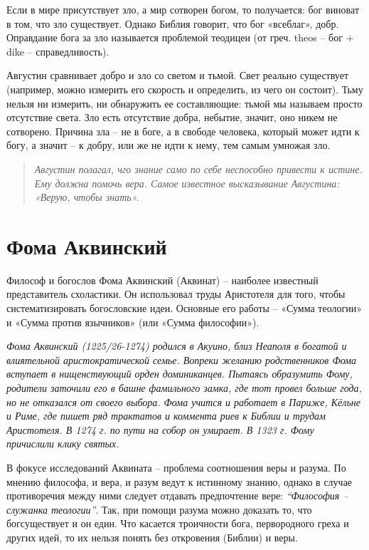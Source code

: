 \documentclass[
]{article}
\begin{document}
Если в мире присутствует зло, а мир сотворен богом, то получается: бог
виноват в том, что зло существует. Однако Библия говорит, что бог
«всеблаг», добр. Оправдание бога за зло называется проблемой теодицеи
(от греч. theos -- бог + dike -- справедливость).

Августин сравнивает добро и зло со светом и тьмой. Свет реально
существует (например, можно измерить его скорость и определить, из чего
он состоит). Тьму нельзя ни измерить, ни обнаружить ее составляющие:
тьмой мы называем просто отсутствие света. Зло есть отсутствие добра,
небытие, значит, оно никем не сотворено. Причина зла -- не в боге, а в
свободе человека, который может идти к богу, а значит -- к добру, или же
не идти к нему, тем самым умножая зло.

\begin{quote}
\emph{Августин полагал, чго знание само по себе неспособно привести к
истине. Ему должна помочь вера. Самое известное высказывание Августина:
«Верую, чтобы знать».}
\end{quote}

\hypertarget{ux444ux43eux43cux430-ux430ux43aux432ux438ux43dux441ux43aux438ux439}{%
\section{Фома
Аквинский}\label{ux444ux43eux43cux430-ux430ux43aux432ux438ux43dux441ux43aux438ux439}}

Философ и богослов Фома Аквинский (Аквинат) -- наиболее известный
представитель схоластики. Он использовал труды Аристотеля для того,
чтобы систематизировать богословские идеи. Основные его работы -- «Сумма
теологии» и «Сумма против язычников» (или «Сумма философии»).

\emph{Фома Аквинский (1225/26-1274) родился в Акуино, близ Неаполя в
богатой и влиятельной аристократической семье. Вопреки желанию
родственников Фома вступает в нищенствующий орден доминиканцев. Пытаясь
образумить Фому, родители заточили его в башне фамильного замка, где тот
провел больше года, но не отказался от своего выбора. Фома учится и
работает в Париже, Кёльне и Риме, где пишет ряд трактатов и коммента­
риев к Библии и трудам Аристотеля. В 1274 г. по пути на собор он
умирает. В 1323 г. Фому причислили клику святых.}

В фокусе исследований Аквината -- проблема соотношения веры и разума. По
мнению философа, и вера, и разум ведут к истинному знанию, однако в
случае противоречия между ними следует отдавать предпочтение вере:
\emph{``Философия -- служанка теологии''}. Так, при помощи разума можно
доказать то, что богсуществует и он един. Что касается троичности бога,
первородного греха и других идей, то их нельзя понять без откровения
(Библии) и веры.
\end{document}
